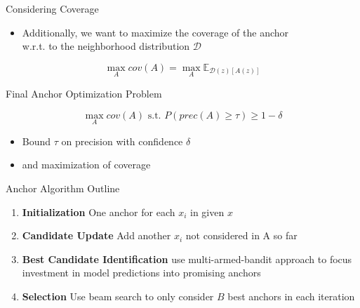 \documentclass[aspectratio=169]{../latex_main/tntbeamer}  %
\begin{document}

\begin{frame}[c]{Considering Coverage}

\begin{itemize}
    \item Additionally, we want to maximize the coverage of the anchor\\ w.r.t. to the neighborhood distribution $\mathcal{D}$
\end{itemize}

$$\max_{A} cov(A) = \max_{A} \mathbb{E}_{\mathcal{D}(z)[A(z)]} $$


\end{frame}


\begin{frame}[c]{Final Anchor Optimization Problem}

\begin{equation}
\max_{A} cov(A) \text{ s.t. } P(prec(A) \geq \tau) \geq 1 - \delta
\end{equation}

\begin{itemize}
    \item Bound $\tau$ on precision with confidence $\delta$
    \item and maximization of coverage
\end{itemize}


\end{frame}


\begin{frame}[c]{Anchor Algorithm Outline }

\begin{enumerate}

    \item \textbf{Initialization} One anchor for each $x_i$ in given $x$
    \item \textbf{Candidate Update} Add another $x_i$ not considered in A so far
    \item \textbf{Best Candidate Identification} use multi-armed-bandit approach to focus investment in model predictions into promising anchors 
    \item \textbf{Selection} Use beam search to only consider $B$ best anchors in each iteration 
\end{enumerate}

\end{frame}
\end{document}
